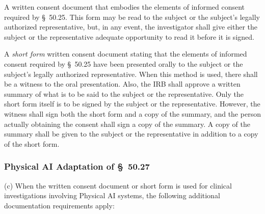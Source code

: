 \documentclass[11pt]{article}
\begin{document}
\begin{description}[leftmargin=1.0cm,style=sameline]
\item[(1)] A written consent document that embodies the elements of informed consent required by \S~50.25. This form may be read to the subject or the subject's legally authorized representative, but, in any event, the investigator shall give either the subject or the representative adequate opportunity to read it before it is signed.
\item[(2)] A \textit{short form} written consent document stating that the elements of informed consent required by \S~50.25 have been presented orally to the subject or the subject's legally authorized representative. When this method is used, there shall be a witness to the oral presentation. Also, the IRB shall approve a written summary of what is to be said to the subject or the representative. Only the short form itself is to be signed by the subject or the representative. However, the witness shall sign both the short form and a copy of the summary, and the person actually obtaining the consent shall sign a copy of the summary. A copy of the summary shall be given to the subject or the representative in addition to a copy of the short form.
\end{description}

\subsubsection{Physical AI Adaptation of \S~50.27}

(c) When the written consent document or short form is used for clinical investigations involving Physical AI systems, the following additional documentation requirements apply:
\end{document}
